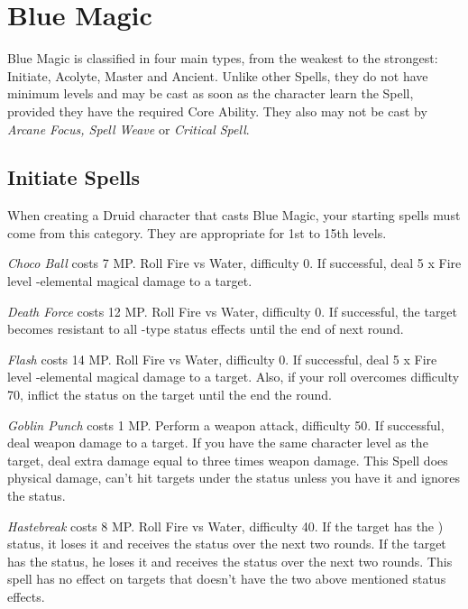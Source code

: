 \section{Blue Magic}
\begin{multicols}{2}

Blue Magic is classified in four main types, from the weakest to the strongest: Initiate, Acolyte, Master and Ancient. Unlike other Spells, they do not have minimum levels and may be cast as soon as the character learn the Spell, provided they have the required Core Ability. They also may not be cast by \textit{Arcane Focus, Spell Weave} or \textit{Critical Spell}.
 
\subsection{Initiate Spells}
	When creating a Druid character that casts Blue Magic, your starting spells must come from this category. They are appropriate for 1st to 15th levels.

    \textit{Choco Ball} costs 7 MP. Roll Fire vs Water, difficulty 0. If successful, deal 5 x Fire level -elemental magical damage to a target.

    \textit{Death Force} costs 12 MP. Roll Fire vs Water, difficulty 0. If successful, the target becomes resistant to all -type status effects until the end of next round.

	\textit{Flash} costs 14 MP. Roll Fire vs Water, difficulty 0. If successful, deal 5 x Fire level -elemental magical damage to a target. Also, if your roll overcomes difficulty 70, inflict the  status on the target until the end the round.
	
    \textit{Goblin Punch} costs 1 MP. Perform a weapon attack, difficulty 50. If successful, deal weapon damage to a target. If you have the same character level as the target, deal extra damage equal to three times weapon damage. This Spell does physical damage, can’t hit targets under the  status unless you have it and ignores the  status.

    \textit{Hastebreak} costs 8 MP. Roll Fire vs Water, difficulty 40. If the target has the ) status, it loses it and receives the  status over the next two rounds. If the target has the  status, he loses it and receives the  status over the next two rounds. This spell has no effect on targets that doesn’t have the two above mentioned status effects.
    

\end{multicols}
